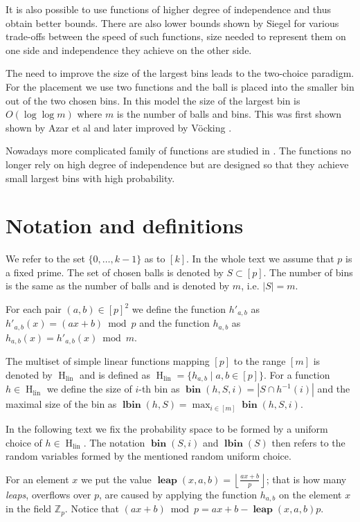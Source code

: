 \documentclass{article}
\newcommand{\hlin}{\operatorname{H}_{\operatorname{lin}}}
\newcommand{\leap}[3]{\operatorname{\mathbf{leap}}({#1}, {#2}, {#3})}
\newcommand{\bin}[3]{\operatorname{\mathbf{bin}}({#1}, {#2}, {#3})}
\newcommand{\lbin}[2]{\operatorname{\mathbf{lbin}}({#1}, {#2})}
\newcommand{\vbin}[2]{\operatorname{\mathbf{bin}}({#1}, {#2})}
\newcommand{\vlbin}[1]{\operatorname{\mathbf{lbin}}({#1})}
\begin{document}
It is also possible to use functions of higher degree of independence and thus obtain better bounds. There are also lower bounds shown by Siegel \cite{siegel} for various trade-offs between the speed of such functions, size needed to represent them on one side and independence they achieve on the other side.

The need to improve the size of the largest bins leads to the two-choice paradigm. For the placement we use two functions and the ball is placed into the smaller bin out of the two chosen bins. In this model the size of the largest bin is $O(\log \log m)$ where $m$ is the number of balls and bins. This was first shown shown by Azar et al \cite{azar} and later improved by V\"{o}cking \cite{vocking}.

Nowadays more complicated family of functions are studied in \cite{wieder}. The functions no longer rely on high degree of independence but are designed so that they achieve small largest bins with high probability.

\section{Notation and definitions}
\label{sec:notation}
We refer to the set $\{0, \dots, k - 1\}$ as to $[k]$. 
In the whole text we assume that $p$ is a fixed prime. 
The set of chosen balls is denoted by $S \subset [p]$.
The number of bins is the same as the number of balls and is denoted by $m$, i.e. $|S| = m$.

For each pair $(a, b) \in [p]^2$ we define the function $h'_{a, b}$ as $h'_{a, b}(x) = (ax + b) \bmod p$ and the function $h_{a, b}$ as $h_{a, b}(x) = h'_{a, b}(x) \bmod m$.

The multiset of simple linear functions mapping $[p]$ to the range $[m]$ is denoted by $\hlin$ and is defined as $\hlin = \{h_{a, b} \mid a, b \in [p] \}$.
For a function $h \in \hlin$ we define the size of $i$-th bin as $\bin{h}{S}{i} = |S \cap h^{-1}(i)|$ and the maximal size of the bin as $\lbin{h}{S} = \max_{i \in [m]} \bin{h}{S}{i}$.

In the following text we fix the probability space to be formed by a uniform choice of $h \in \hlin$.
The notation $\vbin{S}{i}$ and $\vlbin{S}$ then refers to the random variables formed by the mentioned random uniform choice.

For an element $x$ we put the value $\leap{x}{a}{b} = \left\lfloor\frac{ax + b}{p}\right\rfloor$; that is how many \emph{leaps}, overflows over $p$, are caused by applying the function $h_{a, b}$ on the element $x$ in the field $\mathbb{Z}_p$. Notice that $(ax + b) \bmod  p = ax + b - \leap{x}{a}{b}p$.
\end{document}
